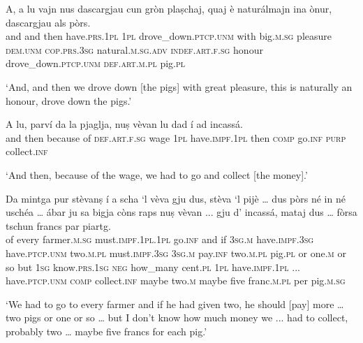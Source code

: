 \begin{linenumbers}
	\gll    A, a lu vajn nus dascargjau cun gròn plaṣchaj, quaj è naturálmajn ina ònur, dascargjau als pòrs.\\
	and and then have.\textsc{prs.1pl} \textsc{1pl} drove\_down.\textsc{ptcp.unm} with  big.\textsc{m.sg} pleasure  \textsc{dem.unm} \textsc{cop.prs.3sg} natural.\textsc{m.sg.adv}  \textsc{indef.art.f.sg} honour drove\_down.\textsc{ptcp.unm} \textsc{def.art.m.pl}  pig.\textsc{pl}  \textsc{}  \textsc{}  \textsc{}  \textsc{}  \textsc{} \\
\end{linenumbers}
\medskip
\glt `And, and then we drove down [the pigs] with great pleasure, this is naturally an honour, drove down the pigs.'
\medskip

\begin{linenumbers}
\gll    A lu, parví da la pjaglja, nuṣ vèvan lu dad í ad incassá.\\
and then because of \textsc{def.art.f.sg} wage \textsc{1pl} have.\textsc{impf.1pl} then  \textsc{comp} go.\textsc{inf}  \textsc{purp}  collect.\textsc{inf} \\
\end{linenumbers}
\medskip
\glt `And then, because of the wage, we had to go and collect [the money].'
\medskip

\begin{linenumbers}
	\gll    Da mintga pur stèvanṣ í a scha `l vèva gju dus, stèva `l pijè …  dus pòrs né in né uschéa … ábar ju sa bigja còns raps nuṣ vèvan\footnotemark{} ... gju d’ incassá, mataj dus … fòrsa tschun francs par piartg.\\
	of every farmer.\textsc{m.sg} must.\textsc{impf.1pl.1pl} go.\textsc{inf} and if \textsc{3sg.m} have.\textsc{impf.3sg} have.\textsc{ptcp.unm} two.\textsc{m.pl} must.\textsc{impf.3sg}  \textsc{3sg.m} pay.\textsc{inf} {} two.\textsc{m.pl} pig.\textsc{pl} or one.\textsc{m} or so {} but  \textsc{1sg}  know.\textsc{prs.1sg}  \textsc{neg} how\_many cent.\textsc{pl} \textsc{1pl} have.\textsc{impf.1pl} ... have.\textsc{ptcp.unm} \textsc{comp} collect.\textsc{inf} maybe two.\textsc{m} {} maybe five franc.\textsc{m.pl} per pig.\textsc{m.sg}\\
\end{linenumbers}
\medskip
\glt `We had to go to every farmer and if he had given two, he should [pay] more … two pigs or one or so … but I don’t know how much money we ... had to collect, probably two … maybe five francs for each pig.'
\medskip

